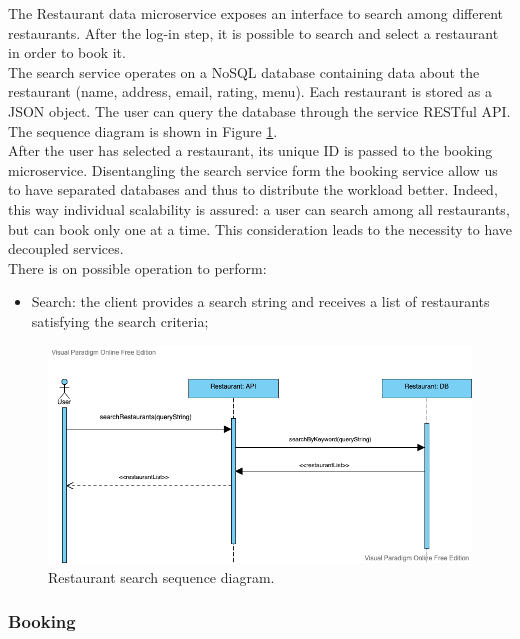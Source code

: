 The Restaurant data microservice exposes an interface to search among different restaurants. After the log-in step, it is possible to search and select a restaurant in order to book it. \\
The search service operates on a NoSQL database containing data about the restaurant (name, address, email, rating, menu). Each restaurant is stored as a JSON object. The user can query the database through the service RESTful API. The sequence diagram is shown in Figure \ref{fig:restaurant_search}. \\
After the user has selected a restaurant, its unique ID is passed to the booking microservice. Disentangling the search service form the booking service allow us to have separated databases and thus to distribute the workload better. Indeed, this way individual scalability is assured: a user can search among all restaurants, but can book only one at a time. This consideration leads to the necessity to have decoupled services. \\
There is on possible operation to perform:

\begin{itemize}
    \item Search: the client provides a search string and receives a list of restaurants satisfying the search criteria;
\end{itemize}

\begin{figure}
    \includegraphics[width=\linewidth]{../docs/sequence/search/search.png}
    \caption{Restaurant search sequence diagram.}
    \label{fig:restaurant_search}
\end{figure}

\subsubsection{Booking}

